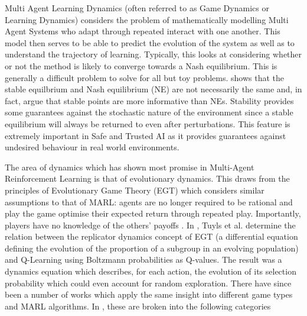 \documentclass[.../main.tex]{subfiles}
\begin{document}
Multi Agent Learning Dynamics (often referred to as Game Dynamics or
Learning Dynamics) considers the problem of mathematically modelling
Multi Agent Systems who adapt through repeated interact with one
another. This model then serves to be able to predict the evolution of
the system as well as to understand the trajectory of
learning. Typically, this looks at considering whether or not the
method is likely to converge towards a Nash equilibrium. This is
generally a difficult problem to solve
\cite{ShohamMultiagentFoundations} for all but toy problems.
\cite{Letcher2019DifferentiableMechanics} shows that the stable
equilbrium and Nash equilibrium (NE) are not necessarily the same and,
in fact, argue that stable points are more informative than NEs.
Stability provides some guarantees against the stochastic nature of
the environment since a stable equilibrium will always be returned to
even after perturbations. This feature is extremely important in Safe
and Trusted AI as it provides guarantees against undesired behaviour
in real world environments.

The area of dynamics which has shown most promise in Multi-Agent
Reinforcement Learning is that of evolutionary dynamics. This draws
from the principles of Evolutionary Game Theory (EGT) which considers
similar assumptions to that of MARL: agents are no longer required to
be rational and play the game optimise their expected return through
repeated play. Importantly, players have no knowledge of the others'
payoffs \cite{Tuyls2006AnGames}. In \cite{Tuyls2006AnGames}, Tuyls et
al.  determine the relation between the replicator dynamics concept of
EGT (a differential equation defining the evolution of the proportion
of a subgroup in an evolving population) and Q-Learning using
Boltzmann probabilities as Q-values. The result was a dynamics
equation which describes, for each action, the evolution of its
selection probability which could even account for random
exploration. There have since been a number of works which apply the
same insight into different game types and MARL algorithms. In
\cite{Bloembergen2015}, these are broken into the following categories
\end{document}

